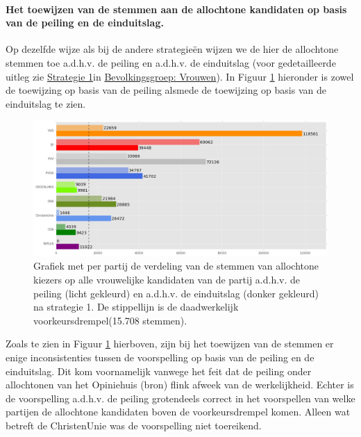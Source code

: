 \paragraph{Het toewijzen van de stemmen aan de allochtone kandidaten op basis van de peiling en de einduitslag.}
Op dezelfde wijze als bij de andere strategie\"{e}n wijzen we de hier de allochtone stemmen toe a.d.h.v. de peiling en a.d.h.v. de einduitslag (voor gedetailleerde uitleg zie \hyperref[S1V]{Strategie 1}in \hyperref[vrouwen]{Bevolkingsgroep: Vrouwen}). In Figuur \ref{fig:stemmenS1A} hieronder is zowel de toewijzing op basis van de peiling alsmede de toewijzing op basis van de einduitslag te zien.





\begin{figure}[H]

	\includegraphics[width=\linewidth]	{stemmen_op_allochtonen_topN_samen2.png}

			\caption{Grafiek met per partij de verdeling van de stemmen van allochtone kiezers op alle vrouwelijke kandidaten van de partij a.d.h.v. de peiling (licht gekleurd) en a.d.h.v. de einduitslag (donker gekleurd) na strategie 1. De stippellijn is de daadwerkelijk voorkeursdrempel(15.708 stemmen).}

\label{fig:stemmenS1A}
\end{figure}


Zoals te zien in Figuur \ref{fig:stemmenS1A} hierboven, zijn bij het toewijzen van de stemmen er enige inconsistenties tussen de voorspelling op basis van de peiling en de einduitslag. Dit kom voornamelijk vanwege het feit dat de peiling onder allochtonen van het Opiniehuis (bron) flink afweek van de werkelijkheid. Echter is de voorspelling a.d.h.v. de peiling grotendeels correct in het voorspellen van welke partijen de allochtone kandidaten boven de voorkeursdrempel komen. Alleen wat betreft de ChristenUnie was de voorspelling niet toereikend.

